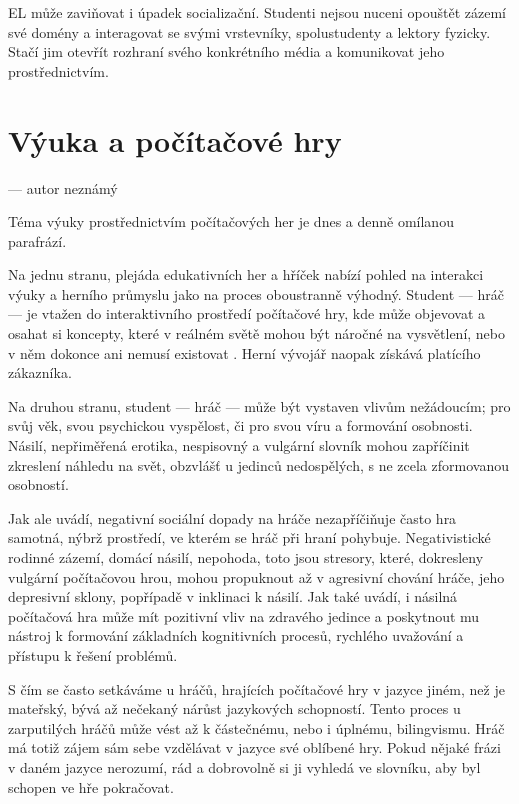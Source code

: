 EL může zaviňovat i úpadek socializační. Studenti nejsou nuceni opouštět zázemí své domény a interagovat se svými vrstevníky, spolustudenty a lektory fyzicky. Stačí jim otevřít rozhraní svého konkrétního média a komunikovat jeho prostřednictvím.

\section{Výuka a počítačové hry}

\epigraph{\sl{}}{--- autor neznámý}

Téma výuky prostřednictvím počítačových her je dnes a denně omílanou parafrází. 

Na jednu stranu, plejáda edukativních her a hříček nabízí pohled na interakci výuky a herního průmyslu jako na proces oboustranně výhodný. Student --- hráč --- je vtažen do interaktivního prostředí počítačové hry, kde může objevovat a osahat si koncepty, které v reálném světě mohou být náročné na vysvětlení, nebo v něm dokonce ani nemusí existovat \cite{graven_2006}. Herní vývojář naopak získává platícího zákazníka.

Na druhou stranu, student --- hráč --- může být vystaven vlivům nežádoucím; pro svůj věk, svou psychickou vyspělost, či pro svou víru a formování osobnosti. Násilí, nepřiměřená erotika, nespisovný a vulgární slovník mohou zapříčinit zkreslení náhledu na svět, obzvlášť u jedinců nedospělých, s ne zcela zformovanou osobností. 

Jak ale \cite{xuemin_2009} uvádí, negativní sociální dopady na hráče nezapříčiňuje často hra samotná, nýbrž prostředí, ve kterém se hráč při hraní pohybuje. Negativistické rodinné zázemí, domácí násilí, nepohoda, toto jsou stresory, které, dokresleny vulgární počítačovou hrou, mohou propuknout až v agresivní chování hráče, jeho depresivní sklony, popřípadě v inklinaci k násilí. Jak \cite{xuemin_2009} také uvádí, i násilná počítačová hra může mít pozitivní vliv na zdravého jedince a poskytnout mu nástroj k formování základních kognitivních procesů, rychlého uvažování a přístupu k řešení problémů.

S čím se často setkáváme u hráčů, hrajících počítačové hry v jazyce jiném, než je mateřský, bývá až nečekaný nárůst jazykových schopností. Tento proces u zarputilých hráčů může vést až k částečnému, nebo i úplnému, bilingvismu. Hráč má totiž zájem sám sebe vzdělávat v jazyce své oblíbené hry. Pokud nějaké frázi v daném jazyce nerozumí, rád a dobrovolně si ji vyhledá ve slovníku, aby byl schopen ve hře pokračovat.

